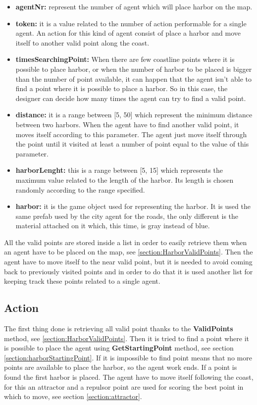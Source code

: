 \documentclass[12pt]{article}
\begin{document}
    \begin{itemize}
        \item \textbf{agentNr:} represent the number of agent which will place harbor on the map.
        \item \textbf{token:} it is a value related to the number of action performable for a single agent. An action for this kind of agent consist of place a harbor 
        and move itself to another valid point along the coast.
        \item \textbf{timesSearchingPoint:} When there are few coastline points where it is possible to place harbor, or when the number of harbor to be placed is bigger than
        the number of point available, it can happen that the agent isn't able to find a point where it is possible to place a harbor. So in this case, the designer can
        decide how many times the agent can try to find a valid point.
        \item \textbf{distance:} it is a range between [5, 50] which represent the minimum distance between two harbors. When the agent have to find another valid point,
        it moves itself according to this parameter. The agent just move itself through the point until it visited at least a number of point equal to the value of this parameter. 
        \item \textbf{harborLenght:} this is a range between [5, 15] which represents the maximum value related to the length of the harbor. Its length is chosen randomly
        according to the range specified.  
        \item \textbf{harbor:} it is the game object used for representing the harbor. It is used the same prefab used by the city agent for the roads, the only different
        is the material attached on it which, this time, is gray instead of blue.
    \end{itemize}

    All the valid points are stored inside a list in order to easily retrieve them when an agent have to be placed on the map, see \ref{section:HarborValidPoints}. Then the 
    agent have to move itself to the near valid point, but it is needed to avoid coming back to previously visited points and in order to do that it is used another list
    for keeping track these points related to a single agent.
    
    \subsection{Action}
    The first thing done is retrieving all valid point thanks to the \textbf{ValidPoints} method, see \ref{section:HarborValidPoints}. Then it is tried to find a point where it is possible to
    place the agent using \textbf{GetStartingPoint} method, see section \ref{section:harborStartingPoint}. If it is impossible to find point means that no more points are available to place
    the harbor, so the agent work ends. If a point is found the first harbor is placed. The agent have to move itself following the coast, for this an attractor and a repulsor
    point are used for scoring the best point in which to move, see section \ref{section:attractor}.
    
\end{document}
